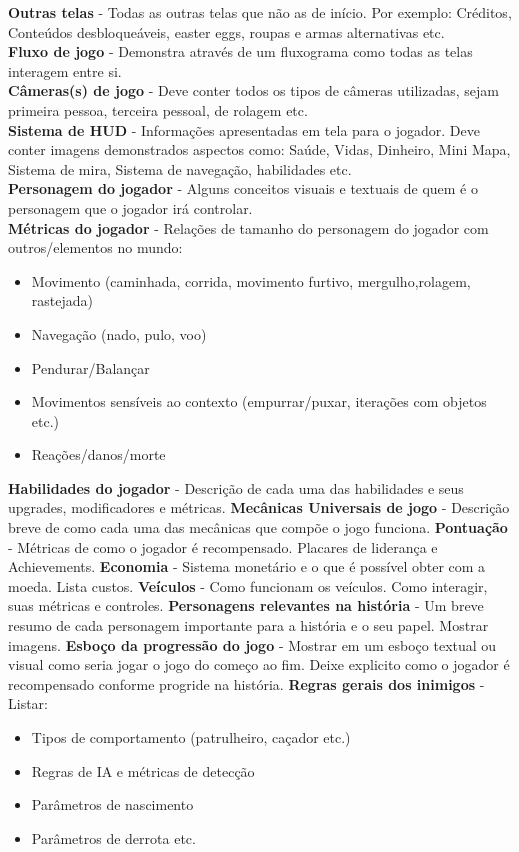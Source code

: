 \documentclass[12pt, 
openright, 
oneside, 
a4paper,    
brazil]{facom-ufu-abntex2}
\begin{document}
\textbf{Outras telas} - Todas as outras telas que não as de início. Por exemplo: Créditos, Conteúdos desbloqueáveis, easter eggs, roupas e armas alternativas etc.\\
\textbf{Fluxo de jogo} - Demonstra através de um fluxograma como todas as telas interagem entre si.\\
\textbf{Câmeras(s) de jogo} - Deve conter todos os tipos de câmeras utilizadas, sejam primeira pessoa, terceira pessoal, de rolagem etc.\\
\textbf{Sistema de HUD} - Informações apresentadas em tela para o jogador. Deve conter imagens demonstrados aspectos como: Saúde, Vidas, Dinheiro, Mini Mapa, Sistema de mira, Sistema de navegação, habilidades etc.\\
\textbf{Personagem do jogador} - Alguns conceitos visuais e textuais de quem é o personagem que o jogador irá controlar.\\
\textbf{Métricas do jogador} - Relações de tamanho do personagem do jogador com outros/elementos no mundo:
	\begin{itemize}
	\item Movimento (caminhada, corrida, movimento furtivo, mergulho,rolagem, rastejada)
	\item Navegação (nado, pulo, voo)
	\item Pendurar/Balançar
	\item Movimentos sensíveis ao contexto (empurrar/puxar, iterações com objetos etc.)
	\item Reações/danos/morte	
	\end{itemize}
\textbf{Habilidades do jogador} - Descrição de cada uma das habilidades e seus upgrades, modificadores e métricas.
\textbf{Mecânicas Universais de jogo} - Descrição breve de como cada uma das mecânicas que compõe o jogo funciona.
\textbf{Pontuação} - Métricas de como o jogador é recompensado. Placares de liderança e  Achievements.
\textbf{Economia} - Sistema monetário e o que é possível obter com a moeda. Lista custos.
\textbf{Veículos} - Como funcionam os veículos. Como interagir, suas métricas e controles.
\textbf{Personagens relevantes na história} - Um breve resumo de cada personagem importante para a história e o seu papel. Mostrar imagens.
\textbf{Esboço da progressão do jogo} - Mostrar em um esboço textual ou visual como seria jogar o jogo do começo ao fim. Deixe explicito como o jogador é recompensado conforme progride na história.   
\textbf{Regras gerais dos inimigos} - Listar:
	\begin{itemize}
	\item Tipos de comportamento (patrulheiro, caçador etc.)
	\item Regras de IA e métricas de detecção
	\item Parâmetros de nascimento
	\item Parâmetros de derrota etc.
	\end{itemize}
\end{document}
